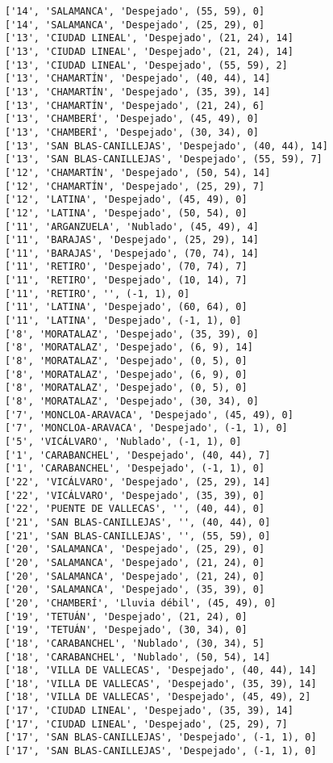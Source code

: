 \documentclass[11pt]{article}
\begin{document}
\begin{Verbatim}[commandchars=\\\{\}]
['14', 'SALAMANCA', 'Despejado', (55, 59), 0]
['14', 'SALAMANCA', 'Despejado', (25, 29), 0]
['13', 'CIUDAD LINEAL', 'Despejado', (21, 24), 14]
['13', 'CIUDAD LINEAL', 'Despejado', (21, 24), 14]
['13', 'CIUDAD LINEAL', 'Despejado', (55, 59), 2]
['13', 'CHAMARTÍN', 'Despejado', (40, 44), 14]
['13', 'CHAMARTÍN', 'Despejado', (35, 39), 14]
['13', 'CHAMARTÍN', 'Despejado', (21, 24), 6]
['13', 'CHAMBERÍ', 'Despejado', (45, 49), 0]
['13', 'CHAMBERÍ', 'Despejado', (30, 34), 0]
['13', 'SAN BLAS-CANILLEJAS', 'Despejado', (40, 44), 14]
['13', 'SAN BLAS-CANILLEJAS', 'Despejado', (55, 59), 7]
['12', 'CHAMARTÍN', 'Despejado', (50, 54), 14]
['12', 'CHAMARTÍN', 'Despejado', (25, 29), 7]
['12', 'LATINA', 'Despejado', (45, 49), 0]
['12', 'LATINA', 'Despejado', (50, 54), 0]
['11', 'ARGANZUELA', 'Nublado', (45, 49), 4]
['11', 'BARAJAS', 'Despejado', (25, 29), 14]
['11', 'BARAJAS', 'Despejado', (70, 74), 14]
['11', 'RETIRO', 'Despejado', (70, 74), 7]
['11', 'RETIRO', 'Despejado', (10, 14), 7]
['11', 'RETIRO', '', (-1, 1), 0]
['11', 'LATINA', 'Despejado', (60, 64), 0]
['11', 'LATINA', 'Despejado', (-1, 1), 0]
['8', 'MORATALAZ', 'Despejado', (35, 39), 0]
['8', 'MORATALAZ', 'Despejado', (6, 9), 14]
['8', 'MORATALAZ', 'Despejado', (0, 5), 0]
['8', 'MORATALAZ', 'Despejado', (6, 9), 0]
['8', 'MORATALAZ', 'Despejado', (0, 5), 0]
['8', 'MORATALAZ', 'Despejado', (30, 34), 0]
['7', 'MONCLOA-ARAVACA', 'Despejado', (45, 49), 0]
['7', 'MONCLOA-ARAVACA', 'Despejado', (-1, 1), 0]
['5', 'VICÁLVARO', 'Nublado', (-1, 1), 0]
['1', 'CARABANCHEL', 'Despejado', (40, 44), 7]
['1', 'CARABANCHEL', 'Despejado', (-1, 1), 0]
['22', 'VICÁLVARO', 'Despejado', (25, 29), 14]
['22', 'VICÁLVARO', 'Despejado', (35, 39), 0]
['22', 'PUENTE DE VALLECAS', '', (40, 44), 0]
['21', 'SAN BLAS-CANILLEJAS', '', (40, 44), 0]
['21', 'SAN BLAS-CANILLEJAS', '', (55, 59), 0]
['20', 'SALAMANCA', 'Despejado', (25, 29), 0]
['20', 'SALAMANCA', 'Despejado', (21, 24), 0]
['20', 'SALAMANCA', 'Despejado', (21, 24), 0]
['20', 'SALAMANCA', 'Despejado', (35, 39), 0]
['20', 'CHAMBERÍ', 'Lluvia débil', (45, 49), 0]
['19', 'TETUÁN', 'Despejado', (21, 24), 0]
['19', 'TETUÁN', 'Despejado', (30, 34), 0]
['18', 'CARABANCHEL', 'Nublado', (30, 34), 5]
['18', 'CARABANCHEL', 'Nublado', (50, 54), 14]
['18', 'VILLA DE VALLECAS', 'Despejado', (40, 44), 14]
['18', 'VILLA DE VALLECAS', 'Despejado', (35, 39), 14]
['18', 'VILLA DE VALLECAS', 'Despejado', (45, 49), 2]
['17', 'CIUDAD LINEAL', 'Despejado', (35, 39), 14]
['17', 'CIUDAD LINEAL', 'Despejado', (25, 29), 7]
['17', 'SAN BLAS-CANILLEJAS', 'Despejado', (-1, 1), 0]
['17', 'SAN BLAS-CANILLEJAS', 'Despejado', (-1, 1), 0]

\end{Verbatim}
\end{document}
